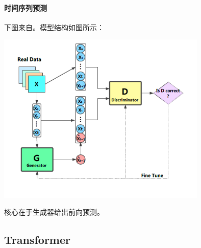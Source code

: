 \paragraph*{时间序列预测}下图来自\cite{ZHANG2019400}。模型结构如图所示：
\begin{center}
\includegraphics[width=10cm]{figure/gan-in-stock-pred.png}
\end{center}

核心在于生成器给出前向预测。

\subsection{Transformer}

